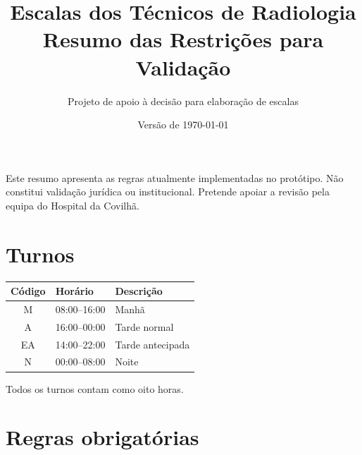 \documentclass[10pt,a4paper]{article}
\title{Escalas dos Técnicos de Radiologia\\
Resumo das Restrições para Validação}
\author{Projeto de apoio à decisão para elaboração de escalas}
\date{Versão de \today}
\begin{document}
\maketitle

Este resumo apresenta as regras atualmente implementadas no protótipo. Não
constitui validação jurídica ou institucional. Pretende apoiar a revisão pela
equipa do Hospital da Covilhã.

\section*{Turnos}

\begin{center}
\begin{tabular}{cll}
\toprule
\textbf{Código} & \textbf{Horário} & \textbf{Descrição} \\
\midrule
M  & 08:00--16:00 & Manhã \\
A  & 16:00--00:00 & Tarde normal \\
EA & 14:00--22:00 & Tarde antecipada \\
N  & 00:00--08:00 & Noite \\
\bottomrule
\end{tabular}
\end{center}

Todos os turnos contam como oito horas.

\section*{Regras obrigatórias}
\end{document}
